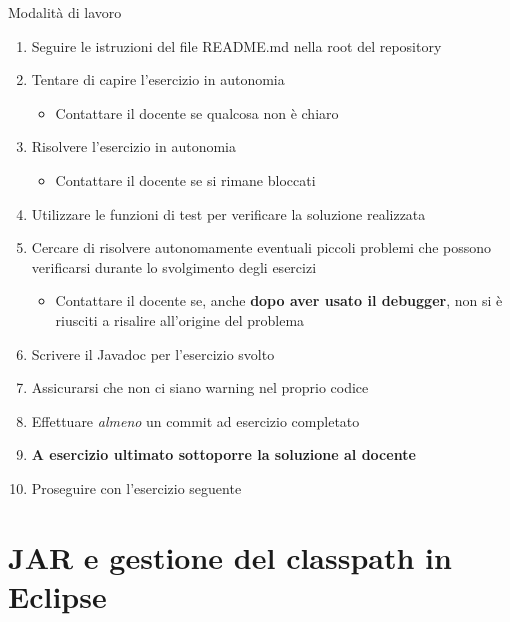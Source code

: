 \documentclass[presentation]{beamer}
\begin{document}
\begin{frame}{Modalità di lavoro}
	\begin{enumerate}
		\item Seguire le istruzioni del file README.md nella root del repository
		\item Tentare di capire l'esercizio in autonomia
		\begin{itemize}
			\item Contattare il docente se qualcosa non è chiaro
		\end{itemize}
		\item Risolvere l'esercizio in autonomia
		\begin{itemize}
			\item Contattare il docente se si rimane bloccati
		\end{itemize}
		\item Utilizzare le funzioni di test per verificare la soluzione realizzata
		\item Cercare di risolvere autonomamente eventuali piccoli problemi che possono verificarsi durante lo svolgimento degli esercizi
		\begin{itemize}
			\item Contattare il docente se, anche \textbf{dopo aver usato il debugger}, non si è riusciti a risalire all'origine del problema
		\end{itemize}
		\item Scrivere il Javadoc per l'esercizio svolto
		\item \alert{Assicurarsi che non ci siano warning nel proprio codice}
		\item Effettuare \textit{almeno} un commit ad esercizio completato
		\item \textbf{A esercizio ultimato sottoporre la soluzione al docente}
		\item Proseguire con l'esercizio seguente
	\end{enumerate}
\end{frame}

\section{JAR e gestione del classpath in Eclipse}
\end{document}
